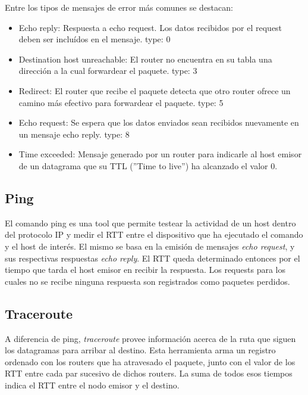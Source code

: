 Entre los tipos de mensajes de error más comunes se destacan:
\begin{itemize}
  \item Echo reply: Respuesta a echo request. Los datos recibidos por el request deben ser incluídos
  en el mensaje. type: 0
  \item Destination host unreachable: El router no encuentra en su tabla una dirección a la cual
  forwardear el paquete. type: 3
  \item Redirect: El router que recibe el paquete detecta que otro router ofrece un camino más
  efectivo para forwardear el paquete. type: 5
  \item Echo request: Se espera que los datos enviados sean recibidos nuevamente en un mensaje echo
  reply. type: 8
  \item Time exceeded: Mensaje generado por un router para indicarle al host emisor de un datagrama
  que su TTL (''Time to live'') ha alcanzado el valor 0.

\end{itemize}


\subsection{Ping}

El comando ping es una tool que permite testear la actividad de un host dentro del protocolo IP y medir
el RTT entre el dispositivo que ha ejecutado el comando y el host de interés. El mismo se basa en
la emisión de mensajes \emph{echo request}, y sus respectivas respuestas \emph{echo reply}. El RTT queda
determinado entonces por el tiempo que tarda el host emisor en recibir la respuesta.
Los requests para los cuales no se recibe ninguna respuesta son registrados como paquetes perdidos.

\subsection{Traceroute}

A diferencia de ping, \emph{traceroute} provee información acerca de la ruta que siguen los datagramas
para arribar al destino. Esta herramienta arma un registro ordenado con los routers que ha atravesado
el paquete, junto con el valor de los RTT entre cada par sucesivo de dichos routers. La suma de todos
esos tiempos indica el RTT entre el nodo emisor y el destino.
